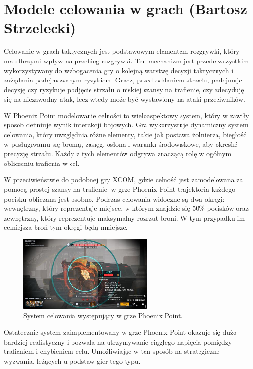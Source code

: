 \section{Modele celowania w grach (Bartosz Strzelecki)}
Celowanie w grach taktycznych jest podstawowym elementem rozgrywki, który ma
olbrzymi wpływ na przebieg rozgrywki. Ten mechanizm jest przede wszystkim wykorzystywany
do wzbogacenia gry o kolejną warstwę decyzji taktycznych i zażądania podejmowanym ryzykiem.
Gracz, przed oddaniem strzału, podejmuje decyzję czy ryzykuje podjęcie strzału o niskiej szansy
na trafienie, czy zdecyduję się na niezawodny atak, lecz wtedy może być wystawiony na ataki przeciwników.

W Phoenix Point modelowanie celności to wieloaspektowy system, który w zawiły sposób definiuje wynik interakcji bojowych. 
Gra wykorzystuje dynamiczny system celowania, który uwzględnia różne elementy, takie jak postawa żołnierza, biegłość w posługiwaniu się bronią, zasięg, 
osłona i warunki środowiskowe, aby określić precyzję strzału. Każdy z tych elementów odgrywa znaczącą rolę w ogólnym obliczeniu trafienia w cel.

W przeciwieństwie do podobnej gry XCOM, gdzie celność jest zamodelowana za pomocą prostej szansy na trafienie, w grze Phoenix Point
trajektoria każdego pocisku obliczana jest osobno. Podczas celowania widoczne są dwa okręgi: wewnętrzny, który reprezentuje miejsce,
w którym znajdzie się 50\% pocisków oraz zewnętrzny, który reprezentuje maksymalny rozrzut broni. W tym przypadku im celniejsza broń tym
okręgi będą mniejsze.

\begin{figure}[h]
\centering
\includegraphics[width=0.6\textwidth]{images/point}
\caption{System celowania występujący w grze Phoenix Point.}
\label{fig:acc}
\end{figure}

Ostatecznie system zaimplementowany w grze Phoenix Point okazuje się dużo bardziej realistyczny i pozwala na utrzymywanie ciągłego napięcia
pomiędzy trafieniem i chybieniem celu. Umożliwiając w ten sposób na strategiczne wyzwania, leżących u podstaw gier tego typu. 
